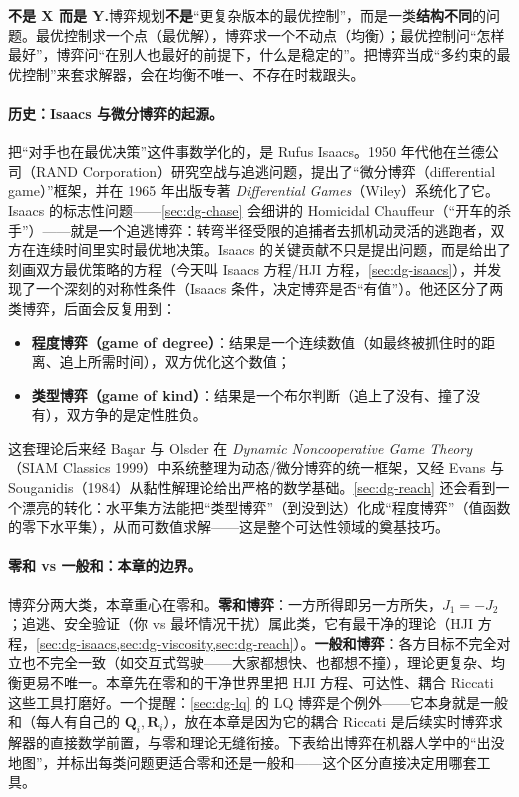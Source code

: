 \begin{note}
\textbf{不是 X 而是 Y.}\;博弈规划\textbf{不是}“更复杂版本的最优控制”，而是一类\textbf{结构不同}的问题。最优控制求一个点（最优解），博弈求一个不动点（均衡）；最优控制问“怎样最好”，博弈问“在别人也最好的前提下，什么是稳定的”。把博弈当成“多约束的最优控制”来套求解器，会在均衡不唯一、不存在时栽跟头。
\end{note}

\paragraph{历史：Isaacs 与微分博弈的起源。}
把“对手也在最优决策”这件事数学化的，是 Rufus Isaacs。1950 年代他在兰德公司（RAND Corporation）研究空战与追逃问题，提出了“微分博弈（differential game）”框架，并在 1965 年出版专著 \emph{Differential Games}（Wiley）系统化了它\cite{isaacs1965differential}。Isaacs 的标志性问题——\cref{sec:dg-chase} 会细讲的 Homicidal Chauffeur（“开车的杀手”）——就是一个追逃博弈：转弯半径受限的追捕者去抓机动灵活的逃跑者，双方在连续时间里实时最优地决策。Isaacs 的关键贡献不只是提出问题，而是给出了刻画双方最优策略的方程（今天叫 Isaacs 方程/HJI 方程，\cref{sec:dg-isaacs}），并发现了一个深刻的对称性条件（Isaacs 条件，决定博弈是否“有值”）。他还区分了两类博弈，后面会反复用到：

\begin{itemize}
  \item \textbf{程度博弈（game of degree）}：结果是一个连续数值（如最终被抓住时的距离、追上所需时间），双方优化这个数值；
  \item \textbf{类型博弈（game of kind）}：结果是一个布尔判断（追上了没有、撞了没有），双方争的是定性胜负。
\end{itemize}

这套理论后来经 Ba\c{s}ar 与 Olsder 在 \emph{Dynamic Noncooperative Game Theory}（SIAM Classics 1999）中系统整理为动态/微分博弈的统一框架\cite{basar1999dynamic}，又经 Evans 与 Souganidis（1984）从黏性解理论给出严格的数学基础\cite{evans1984differential}。\cref{sec:dg-reach} 还会看到一个漂亮的转化：水平集方法能把“类型博弈”（到没到达）化成“程度博弈”（值函数的零下水平集），从而可数值求解——这是整个可达性领域的奠基技巧。

\paragraph{零和 vs 一般和：本章的边界。}
博弈分两大类，本章重心在零和。\textbf{零和博弈}：一方所得即另一方所失，$J_1=-J_2$；追逃、安全验证（你 vs 最坏情况干扰）属此类，它有最干净的理论（HJI 方程，\cref{sec:dg-isaacs,sec:dg-viscosity,sec:dg-reach}）。\textbf{一般和博弈}：各方目标不完全对立也不完全一致（如交互式驾驶——大家都想快、也都想不撞），理论更复杂、均衡更易不唯一。本章先在零和的干净世界里把 HJI 方程、可达性、耦合 Riccati 这些工具打磨好。一个提醒：\cref{sec:dg-lq} 的 LQ 博弈是个例外——它本身就是一般和（每人有自己的 $\mathbf Q_i,\mathbf R_i$），放在本章是因为它的耦合 Riccati 是后续实时博弈求解器的直接数学前置，与零和理论无缝衔接。下表给出博弈在机器人学中的“出没地图”，并标出每类问题更适合零和还是一般和——这个区分直接决定用哪套工具。

